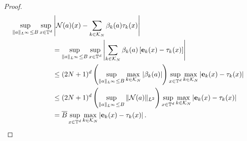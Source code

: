 \documentclass[reqno,a4paper]{amsart}
\begin{document}
\begin{proof}
\begin{align*}
\sup_{\Vert a \Vert_{L^\infty} \le B}
\sup_{x\in \mathbb{T}^d}
&\left|
\mathcal{N}(a)(x) - \sum_{k\in \mathcal{K}_N} \beta_k(a) \tau_k(x)
\right|
\\
&=
\sup_{\Vert a \Vert_{L^\infty} \le B}\sup_{x\in \mathbb{T}^d}
\left|
\sum_{k\in \mathcal{K}_N} \beta_k(a) \left[\bm{\mathrm{e}}_k(x) - \tau_k(x) \right]
\right|
\\
&\le
(2N+1)^d
\left(
\sup_{\Vert a \Vert_{L^\infty} \le B} \max_{k\in \mathcal{K}_N}
|\beta_k(a) |
\right)
\sup_{x\in \mathbb{T}^d}
\max_{k\in \mathcal{K}_N}
\left|\bm{\mathrm{e}}_k(x) - \tau_k(x) \right|
\\
&\le
(2N+1)^d
\left(
\sup_{\Vert a \Vert_{L^\infty} \le B} \Vert \mathcal{N}(a) \Vert_{L^2}
\right)
\sup_{x\in \mathbb{T}^d}
\max_{k\in \mathcal{K}_N}
\left|\bm{\mathrm{e}}_k(x) - \tau_k(x) \right|
\\
&=
\overline{B}
\sup_{x\in \mathbb{T}^d}
\max_{k\in \mathcal{K}_N}
\left|\bm{\mathrm{e}}_k(x) - \tau_k(x) \right|
.
\end{align*}
\end{proof}
\end{document}
